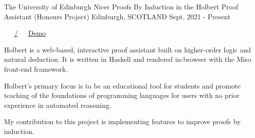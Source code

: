 


\begin{cventries}
  \cventry
    {The University of Edinburgh} %
    {Nicer Proofs By Induction in the Holbert Proof Assistant (Honours Project)} %
    {Edinburgh, SCOTLAND} %
    {Sept. 2021 - Present} %
    {
      \color{awesome} \color{graytext}\ \ \ \href{https://github.com/chrisjpm/holbert}{\faGithub\acvHeaderIconSep\@chrisjpm/\@holbert}\ \ \ \href{http://liamoc.net/holbert}{\faGlobe\acvHeaderIconSep\@Holbert Demo}%
      \vspace{1.8em}
      \begin{cvitems} %
        \item Holbert is a web-based, interactive proof assistant built on higher-order logic and natural deduction. It is written in Haskell and rendered in-browser with the Miso front-end framework.
        \item Holbert’s primary focus is to be an educational tool for students and promote teaching of the foundations of programming languages for users with no prior experience in automated reasoning.
        \item My contribution to this project is implementing features to improve proofs by induction.
      \end{cvitems}
    }
    \vspace{.08cm}
    

\end{cventries}
